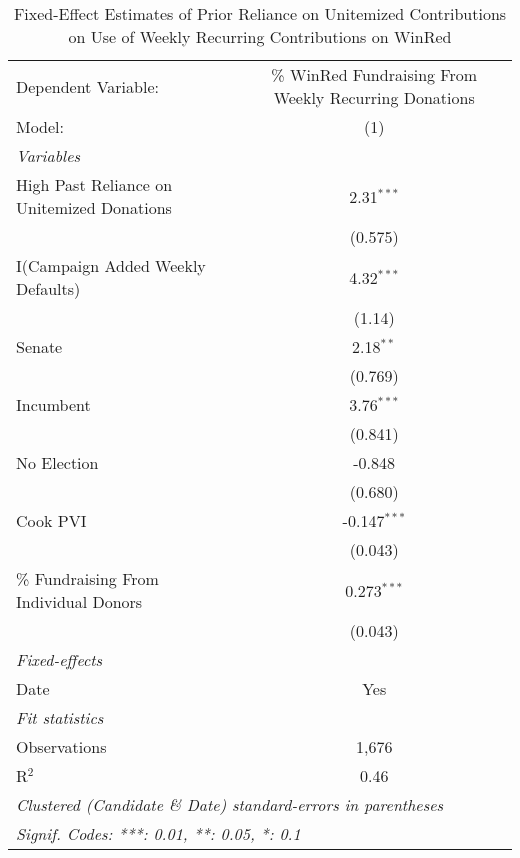 
\begin{table}[htbp]
   \caption{\label{tab:heterogeneity-effect-unitem-pnas-weekly-chain} Fixed-Effect Estimates of Prior Reliance on Unitemized Contributions on Use of Weekly Recurring Contributions on WinRed}
   \centering
   \begin{tabular}{lc}
      \tabularnewline \midrule \midrule
      Dependent Variable:                        & \% WinRed Fundraising From Weekly Recurring Donations\\   
      Model:                                     & (1)\\  
      \midrule
      \emph{Variables}\\
      High Past Reliance on Unitemized Donations & 2.31$^{***}$\\   
                                                 & (0.575)\\   
      I(Campaign Added Weekly Defaults)          & 4.32$^{***}$\\   
                                                 & (1.14)\\   
      Senate                                     & 2.18$^{**}$\\   
                                                 & (0.769)\\   
      Incumbent                                  & 3.76$^{***}$\\   
                                                 & (0.841)\\   
      No Election                                & -0.848\\   
                                                 & (0.680)\\   
      Cook PVI                                   & -0.147$^{***}$\\   
                                                 & (0.043)\\   
      \% Fundraising From Individual Donors      & 0.273$^{***}$\\   
                                                 & (0.043)\\   
      \midrule
      \emph{Fixed-effects}\\
      Date                                       & Yes\\  
      \midrule
      \emph{Fit statistics}\\
      Observations                               & 1,676\\  
      R$^2$                                      & 0.46\\  
      \midrule \midrule
      \multicolumn{2}{l}{\emph{Clustered (Candidate \& Date) standard-errors in parentheses}}\\
      \multicolumn{2}{l}{\emph{Signif. Codes: ***: 0.01, **: 0.05, *: 0.1}}\\
   \end{tabular}
\end{table}


